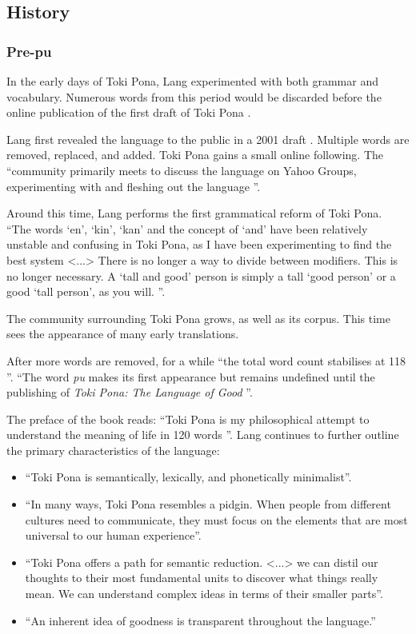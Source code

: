 \documentclass[14pt, a4paper]{extreport}
\begin{document}
    \subsection{History}
      \subsubsection{Pre-pu}
In the early days of Toki Pona, Lang experimented with both grammar and vocabulary. Numerous words from this period would be discarded before the online publication of the first draft of Toki Pona \parencite{evo}.

Lang first revealed the language to the public in a 2001 draft \parencite{firstdraft}. Multiple words are removed, replaced, and added. Toki Pona gains a small online following. The ``community primarily meets to discuss the language on Yahoo Groups, experimenting with and fleshing out the language \parencite{evo}''.

Around this time, Lang performs the first grammatical reform of Toki Pona. ``The words `en', `kin', `kan' and the concept of `and' have been relatively unstable and confusing in Toki Pona, as I have been experimenting to find the best system <...> There is no longer a way to divide between modifiers. This is no longer necessary. A `tall and good' person is simply a tall `good person' or a good `tall person', as you will. \parencite{enkinkan}''.

The community surrounding Toki Pona grows, as well as its corpus. This time sees the appearance of many early translations.

After more words are removed, for a while ``the total word count stabilises at 118 \parencite{evo}''.  ``The word \textit{pu} makes its first appearance but remains undefined until the publishing of \textit{Toki Pona: The Language of Good} \parencite{evo}''.

The preface of the book reads: ``Toki Pona is my philosophical attempt to understand the meaning of life in 120 words \parencite{pu}''. Lang continues to further outline the primary characteristics of the language:

\begin{itemize}
  \item ``Toki Pona is semantically, lexically, and phonetically minimalist''.
  \item ``In many ways, Toki Pona resembles a pidgin. When people from different cultures need to communicate, they must focus on the elements that are most universal to our human experience''.
  \item ``Toki Pona offers a path for semantic reduction. <...> we can distil our thoughts to their most fundamental units to discover what things really mean. We can understand complex ideas in terms of their smaller parts''.
  \item ``An inherent idea of goodness is transparent throughout the language.''
\end{itemize}
\end{document}

